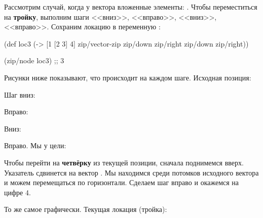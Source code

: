 Рассмотрим случай, когда у вектора вложенные элементы: \code{[1 [2 3] 4]}. Чтобы
переместиться на \textbf{тройку}, выполним шаги <<вниз>>, <<вправо>>, <<вниз>>,
<<вправо>>. Сохраним локацию в переменную :

\begin{english}
  \begin{clojure}
(def loc3
  (-> [1 [2 3] 4]
      zip/vector-zip
      zip/down
      zip/right
      zip/down
      zip/right))

(zip/node loc3)
;; 3
  \end{clojure}
\end{english}

Рисунки ниже показывают, что происходит на каждом шаге. Исходная позиция:

\begin{figure}[H]
  \centering
  
  \label{fig:chart-zip-04}
\end{figure}

Шаг вниз:

\begin{figure}[H]
  \centering
  
  \label{fig:chart-zip-05}
\end{figure}

Вправо:

\begin{figure}[H]
  \centering
  
  \label{fig:chart-zip-06}
\end{figure}

Вниз:

\begin{figure}[H]
  \centering
  
  \label{fig:chart-zip-07}
\end{figure}

Вправо. Мы у цели:

\begin{figure}[H]
  \centering
  
  \label{fig:chart-zip-08}
\end{figure}

Чтобы перейти на \textbf{четвёрку} из текущей позиции, сначала поднимемся
вверх. Указатель сдвинется на вектор \code{[2 3]}. Мы находимся среди потомков
исходного вектора и можем перемещаться по горизонтали. Сделаем шаг вправо и
окажемся на цифре 4.

То же самое графически. Текущая локация (тройка):

\begin{figure}[H]
  \centering
  
  \label{fig:chart-zip-09}
\end{figure}


